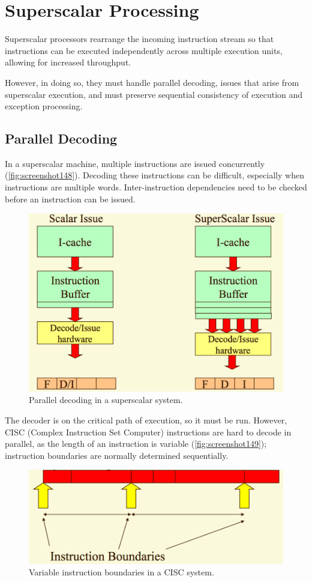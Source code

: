 \chapter{Superscalar Processing}
Superscalar processors rearrange the incoming instruction stream so that instructions can be executed independently across multiple execution units, allowing for increased throughput.

However, in doing so, they must handle parallel decoding, issues that arise from superscalar execution, and must preserve sequential consistency of execution and exception processing.

\section{Parallel Decoding}
In a superscalar machine, multiple instructions are issued concurrently (\autoref{fig:screenshot148}). Decoding these instructions can be difficult, especially when instructions are multiple words. Inter-instruction dependencies need to be checked before an instruction can be issued.

\begin{figure}
\centering
\includegraphics[width=0.7\linewidth]{figures/screenshot148}
\caption{Parallel decoding in a superscalar system.}
\label{fig:screenshot148}
\end{figure}

The decoder is on the critical path of execution, so it must be run. However, CISC (Complex Instruction Set Computer) instructions are hard to decode in parallel, as the length of an instruction is variable (\autoref{fig:screenshot149}); instruction boundaries are normally determined sequentially.

\begin{figure}
\centering
\includegraphics[width=0.7\linewidth]{figures/screenshot149}
\caption{Variable instruction boundaries in a CISC system.}
\label{fig:screenshot149}
\end{figure}

